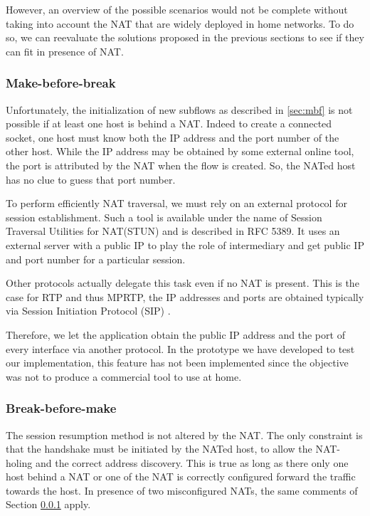 However, an overview of the possible scenarios would not be complete without taking into account the NAT that are widely deployed in home networks. To do so, we can reevaluate the solutions proposed in the previous sections to see if they can fit in presence of NAT.



\subsubsection{Make-before-break}\label{sec:nat-mbb}

Unfortunately, the initialization of new subflows as described in \ref{sec:mbf} is not possible if at least one host is behind a NAT. Indeed to create a connected socket, one host must know both the IP address and the port number of the other host. While the IP address may be obtained by some external online tool, the port is attributed by the NAT when the flow is created. So, the NATed host has no clue to guess that port number.

To perform efficiently NAT traversal, we must rely on an external protocol for session establishment. Such a tool is available under the name of Session Traversal Utilities for NAT(STUN) and is described in RFC 5389\cite{RFC5389}. It uses an external server with a public IP to play the role of intermediary and get public IP and port number for a particular session.

Other protocols actually delegate this task even if no NAT is present. This is the case for RTP and thus MPRTP, the IP addresses and ports are obtained typically via Session Initiation Protocol (SIP) \cite{RFC3261}.

Therefore, we let the application obtain the public IP address and the port of every interface via another protocol. In the prototype we have developed to test our implementation, this feature has not been implemented since the objective was not to produce a commercial tool to use at home.


\subsubsection{Break-before-make}
The session resumption method is not altered by the NAT. The only constraint is that the handshake must be initiated by the NATed host, to allow the NAT-holing and the correct address discovery. This is true as long as there only one host behind a NAT or one of the NAT is correctly configured forward the traffic towards the host. In presence of two misconfigured NATs, the same comments of Section \ref{sec:nat-mbb} apply.


